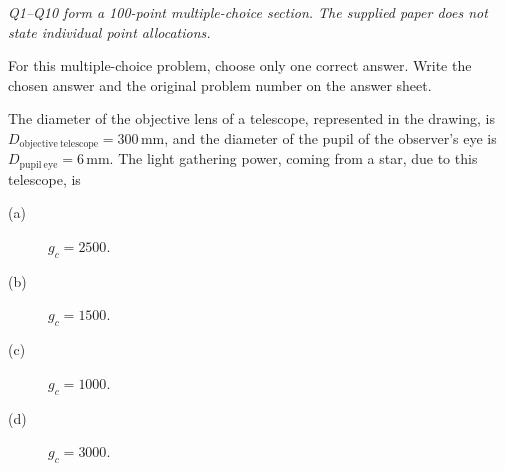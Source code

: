 \textit{Q1--Q10 form a 100-point multiple-choice section. The supplied paper
does not state individual point allocations.}

For this multiple-choice problem, choose only one correct answer. Write the
chosen answer and the original problem number on the answer sheet.

The diameter of the objective lens of a telescope, represented in the drawing, is
$D_{\mathrm{objective\ telescope}}=300\,\mathrm{mm}$, and the diameter of the
pupil of the observer's eye is $D_{\mathrm{pupil\ eye}}=6\,\mathrm{mm}$.
The light gathering power, coming from a star, due to this telescope, is
\begin{description}
\item[(a)] $g_c=2500$.
\item[(b)] $g_c=1500$.
\item[(c)] $g_c=1000$.
\item[(d)] $g_c=3000$.
\end{description}
